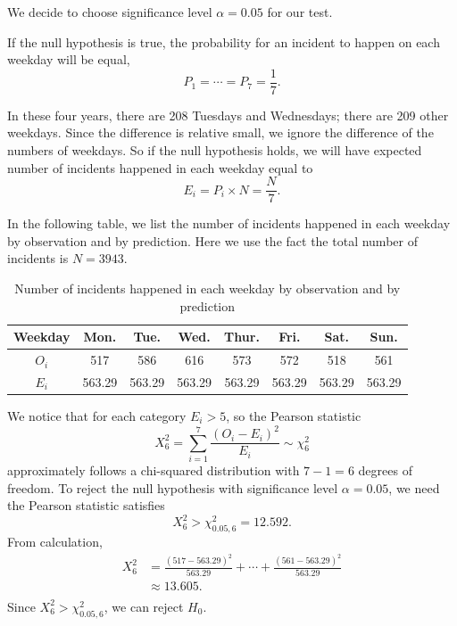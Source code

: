 \documentclass[11pt,a4paper,english]{article}
\begin{document}
We decide to choose significance level $\alpha = 0.05$ for our test.

If the null hypothesis is true, the probability for an incident to happen on each weekday will be equal,
\begin{equation*}
	P_{1} = \cdots = P_{7} = \frac{1}{7}.
\end{equation*}

In these four years, there are 208  Tuesdays and Wednesdays; there are 209 other weekdays. 
Since the difference is relative small, we ignore the difference of the numbers of weekdays.
So if the null hypothesis holds, we will have expected number of incidents happened in each weekday equal to
\begin{equation*}
	E_{i} = P_{i} \times N = \frac{N}{7}.
\end{equation*}

In the following table, we list the number of incidents happened in each weekday by observation and by prediction. 
Here we use the fact the total number of incidents is $N = 3943$.
\begin{table}[htbp]
	\centering
	\begin{tabular}{c|ccccccc}
		\hline
		Weekday & Mon. & Tue. & Wed. & Thur. & Fri. & Sat. & Sun.\\
		\hline
		$O_{i}$ & 517 & 586 & 616 & 573 & 572 & 518 & 561\\ \hline
		$E_{i}$ & 563.29 & 563.29 & 563.29 & 563.29 & 563.29 & 563.29 & 563.29\\
		\hline
	\end{tabular}
	\caption{Number of incidents happened in each weekday by observation and by prediction}
\end{table}

We notice that for each category $E_{i} > 5$, so the Pearson statistic
\begin{equation*}
	X^{2}_{6} = \sum_{i = 1}^{7}\frac{(O_{i} - E_{i})^{2}}{E_{i}}
	\sim \chi^{2}_{6}
\end{equation*}
approximately follows a chi-squared distribution with $7-1 = 6$ degrees of freedom. 
To reject the null hypothesis with significance level $\alpha = 0.05$, we need the Pearson statistic satisfies
\begin{equation*}
	X^{2}_{6} > \chi^{2}_{0.05,6} = 12.592.
\end{equation*}
From calculation,
\begin{align*}
	X^{2}_{6} &= \frac{(517-563.29)^{2}}{563.29}+\cdots+\frac{(561-563.29)^{2}}{563.29}\\
	&\approx 13.605.\\
\end{align*}
Since $X^{2}_{6} > \chi^{2}_{0.05,6}$, we can reject $H_{0}$.
\end{document}
